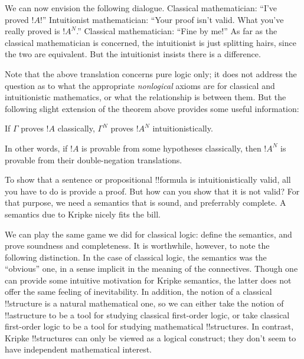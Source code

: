 \documentclass[../../../include/open-logic-section]{subfiles}
\begin{document}
We can now envision the following dialogue. Classical mathematician:
``I've proved $!A$!'' Intuitionist mathematician: ``Your proof isn't
valid. What you've really proved is $!A^N$.'' Classical mathematician:
``Fine by me!'' As far as the classical mathematician is concerned, the
intuitionist is just splitting hairs, since the two are
equivalent. But the intuitionist insists there is a difference.

Note that the above translation concerns pure logic only; it does not
address the question as to what the appropriate \emph{nonlogical}
axioms are for classical and intuitionistic mathematics, or what the
relationship is between them. But the following slight extension of
the theorem above provides some useful information:

\begin{thm}
If $\Gamma$ proves $!A$ classically, $\Gamma^N$ proves $!A^N$
intuitionistically.
\end{thm}

In other words, if $!A$ is provable from some hypotheses classically,
then $!A^N$ is provable from their double-negation translations.

To show that a sentence or propositional !!{formula} is intuitionistically
valid, all you have to do is provide a proof. But how can you show
that it is not valid? For that purpose, we need a semantics
that is sound, and preferrably complete. A semantics
due to Kripke nicely fits the bill.

We can play the same game we did for classical logic: define the
semantics, and prove soundness and completeness. It is worthwhile,
however, to note the following distinction. In the case of classical
logic, the semantics was the ``obvious'' one, in a sense implicit in
the meaning of the connectives. Though one can provide some intuitive
motivation for Kripke semantics, the latter does not offer the same
feeling of inevitability. In addition, the notion of a classical
!!{structure} is a natural mathematical one, so we can either take the
notion of !!a{structure} to be a tool for studying classical first-order
logic, or take classical first-order logic to be a tool for studying
mathematical !!{structure}s. In contrast, Kripke !!{structure}s can only be
viewed as a logical construct; they don't seem to have independent
mathematical interest.
\end{document}
